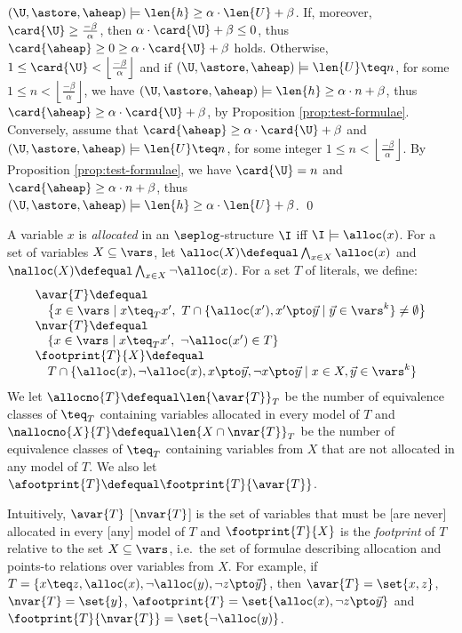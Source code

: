 {\begin{compactitem}
    $(\U,\astore,\aheap) \models \len{h} \geq \alpha \cdot \len{U} +
    \beta$. If, moreover, $\card{\U} \geq \frac{-\beta}{\alpha}$, then
    $\alpha\cdot\card{\U}+\beta \leq 0$, thus $\card{\aheap} \geq 0
    \geq \alpha\cdot\card{\U}+\beta$ holds. Otherwise, $1 \leq
    \card{\U} < \left\lfloor\frac{-\beta}{\alpha}\right\rfloor$ and if
    $(\U,\astore,\aheap) \models \len{U} \teq n$, for some $1 \leq n <
    \left\lfloor\frac{-\beta}{\alpha}\right\rfloor$, we have
    $(\U,\astore,\aheap) \models \len{h} \geq \alpha \cdot n + \beta$,
    thus $\card{\aheap} \geq \alpha \cdot \card{\U} + \beta$, by
    Proposition \ref{prop:test-formulae}. Conversely, assume that
    $\card{\aheap} \geq \alpha \cdot \card{\U} + \beta$ and
    $(\U,\astore,\aheap) \models \len{U} \teq n$, for some integer $1
    \leq n < \left\lfloor\frac{-\beta}{\alpha}\right\rfloor$. By
    Proposition \ref{prop:test-formulae}, we have $\card{\U} = n$ and
    $\card{\aheap} \geq \alpha \cdot n + \beta$, thus
    $(\U,\astore,\aheap) \models \len{h} \geq \alpha \cdot \len{U} +
    \beta$. \qed
  \end{compactitem}}

\begin{definition}\label{def:anvar}
A variable $x$ is \emph{allocated} in an $\seplog$-structure $\I$ iff
$\I \models \alloc(x)$. For a set of variables $X \subseteq \vars$,
let $\alloc(X) \defequal \bigwedge_{x \in X} \alloc(x)$ and
$\nalloc(X) \defequal \bigwedge_{x \in X} \neg\alloc(x)$. For a set
$T$ of literals, we define:
\[\begin{array}{l}
\avar{T} \defequal \\ 
\quad \big\{x \in \vars \mid x \teq_T x',~ T \cap \{\alloc(x'), x'\pto \vec{y} \mid \vec{y} \in \vars^k\} \neq \emptyset\big\} \\
\nvar{T} \defequal \\ 
\quad \{x \in \vars \mid x \teq_T x',~ \neg\alloc(x') \in T\} \\
\footprint{T}{X} \defequal \\ 
\quad T \cap \{\alloc(x), \neg\alloc(x), x \pto \vec{y}, \neg x \pto \vec{y} \mid x \in X, \vec{y} \in \vars^k\}
\end{array}\]
We let $\allocno{T} \defequal \len{\avar{T}}_T$ be the number of
equivalence classes of $\teq_T$ containing variables allocated in
every model of $T$
and $\nallocno{X}{T} \defequal \len{X \cap \nvar{T}}_T$ be the number
of equivalence classes of $\teq_T$ containing variables from $X$ that
are not allocated in any model of $T$. We also let $\afootprint{T}
\defequal \footprint{T}{\avar{T}}$.
\end{definition}
Intuitively, $\avar{T}$ [$\nvar{T}$] is the set of variables that must
be [are never] allocated in every [any] model of $T$ and
$\footprint{T}{X}$ is the \emph{footprint} of $T$ relative to the set
$X \subseteq \vars$, i.e.\ the set of formulae describing allocation
and points-to relations over variables from $X$.
For example, if $T = \{x \teq z, \alloc(x), \neg\alloc(y), \neg z \pto
\vec{y}\}$, then $\avar{T} = \set{x,z}$, $\nvar{T} = \set{y}$,
$\afootprint{T} = \set{\alloc(x),\neg z \pto \vec{y}}$ and
$\footprint{T}{\nvar{T}} = \set{\neg\alloc(y)}$. 

